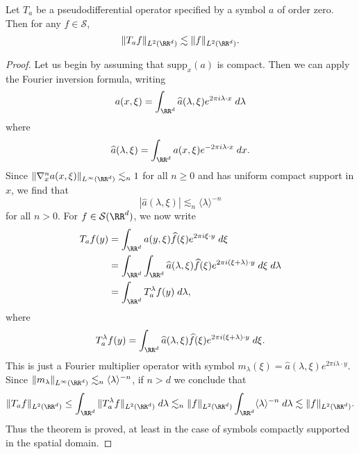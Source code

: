 \begin{theorem}
    Let $T_a$ be a pseudodifferential operator specified by a symbol $a$ of order zero. Then for any $f \in \mathcal{S}$,
    \[ \| T_af \|_{L^2(\RR^d)} \lesssim \| f \|_{L^2(\RR^d)}. \]
\end{theorem}
\begin{proof}
    Let us begin by assuming that $\text{supp}_x(a)$ is compact. Then we can apply the Fourier inversion formula, writing
    \[ a(x,\xi) = \int_{\RR^d} \widehat{a}(\lambda,\xi) e^{2 \pi i \lambda \cdot x}\; d\lambda \]
    where
    \[ \widehat{a}(\lambda,\xi) = \int_{\RR^d} a(x,\xi) e^{- 2 \pi i \lambda \cdot x}\; dx. \]
    Since $\| \nabla^n_x a(x,\xi) \|_{L^\infty(\RR^d)} \lesssim_n 1$ for all $n \geq 0$ and has uniform compact support in $x$, we find that
    \[ |\widehat{a}(\lambda,\xi)| \lesssim_n \langle \lambda \rangle^{-n} \]
    for all $n > 0$. For $f \in \mathcal{S}(\RR^d)$, we now write
    \begin{align*}
        T_af(y) &= \int_{\RR^d} a(y,\xi) \widehat{f}(\xi) e^{2 \pi i \xi \cdot y}\; d\xi\\
        &= \int_{\RR^d} \int_{\RR^d} \widehat{a}(\lambda,\xi) \widehat{f}(\xi) e^{2 \pi i (\xi + \lambda) \cdot y}\; d\xi\; d\lambda\\
        &= \int_{\RR^d} T_a^\lambda f(y)\; d\lambda,
    \end{align*}
    where
    \[ T_a^\lambda f(y) = \int_{\RR^d} \widehat{a}(\lambda,\xi) \widehat{f}(\xi) e^{2 \pi i (\xi + \lambda) \cdot y}\; d\xi. \]
    This is just a Fourier multiplier operator with symbol $m_\lambda(\xi) = \widehat{a}(\lambda,\xi) e^{2 \pi i \lambda \cdot y}$. Since $\| m_\lambda \|_{L^\infty(\RR^d)} \lesssim_n \langle \lambda \rangle^{-n}$, if $n > d$ we conclude that
    \[ \| T_af \|_{L^2(\RR^d)} \leq \int_{\RR^d} \| T_a^\lambda f \|_{L^2(\RR^d)}\; d\lambda \lesssim_n \| f \|_{L^2(\RR^d)} \int_{\RR^d} \langle \lambda \rangle^{-n}\; d\lambda \lesssim \| f \|_{L^2(\RR^d)}. \]
    Thus the theorem is proved, at least in the case of symbols compactly supported in the spatial domain.


\end{proof}
